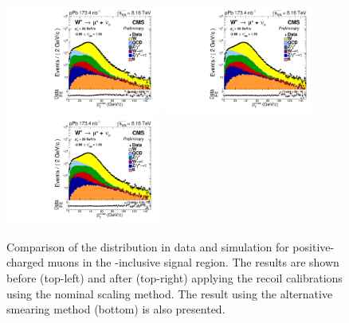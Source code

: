 \begin{figure}[htb!]
 \centering
 \includegraphics[width=0.45\textwidth]{Figures/WBoson/Analysis/Correction/Recoil/CheckFits/W/METPF_RAW_HFBosonPTrew/PLOT_MET_DATA_WToMuPl_PA_Model_TEMP_WDYDYToTauWToTauTTbar_ModifiedRayleigh_QCD_MuEtaCM_-286_193_MuIso_0_15.pdf}
 \includegraphics[width=0.45\textwidth]{Figures/WBoson/Analysis/Correction/Recoil/CheckFits/W/Recoil_ScalingGauss/PLOT_MET_DATA_WToMuPl_PA_Model_TEMP_WDYDYToTauWToTauTTbar_ModifiedRayleigh_QCD_MuEtaCM_-286_193_MuIso_0_15.pdf}
 \includegraphics[width=0.45\textwidth]{Figures/WBoson/Analysis/Correction/Recoil/CheckFits/W/Recoil_Smearing/PLOT_MET_DATA_WToMuPl_PA_Model_TEMP_WDYDYToTauWToTauTTbar_ModifiedRayleigh_QCD_MuEtaCM_-286_193_MuIso_0_15.pdf}
 \caption{Comparison of the \ptmiss distribution in data and simulation for positive-charged muons in the  \etaMuCM-inclusive signal region. The results are shown before (top-left) and after (top-right) applying the recoil calibrations using the nominal scaling method. The result using the alternative smearing method (bottom) is also presented.}
 \label{fig:recoilCorrWreg}
\end{figure}


